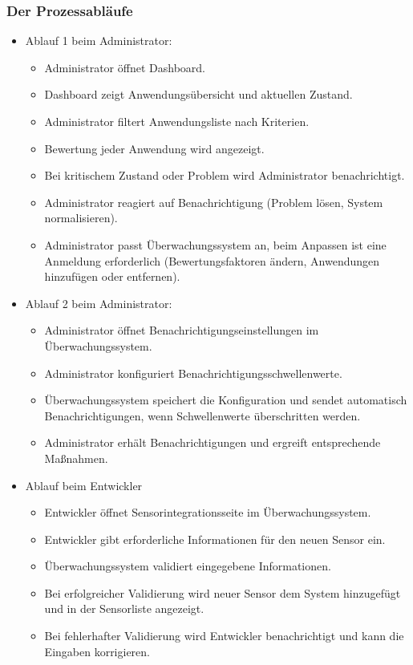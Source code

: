 \begin{flushleft}
	\subsubsection{Der Prozessabläufe}
	\begin{itemize}
	\item Ablauf 1 beim Administrator:
		\begin{itemize}
		\item Administrator öffnet Dashboard.
		\item Dashboard zeigt Anwendungsübersicht und aktuellen Zustand.
		\item Administrator filtert Anwendungsliste nach Kriterien.
		\item Bewertung jeder Anwendung wird angezeigt.
		\item Bei kritischem Zustand oder Problem wird Administrator benachrichtigt.
		\item Administrator reagiert auf Benachrichtigung (Problem lösen, System normalisieren).
		\item Administrator passt Überwachungssystem an, beim Anpassen ist eine Anmeldung erforderlich (Bewertungsfaktoren ändern, Anwendungen hinzufügen oder entfernen).
		\end{itemize}
		\item Ablauf 2 beim Administrator:
		\begin{itemize}
		\item Administrator öffnet Benachrichtigungseinstellungen im Überwachungssystem.
				\item Administrator konfiguriert Benachrichtigungsschwellenwerte.
				\item Überwachungssystem speichert die Konfiguration und sendet automatisch Benachrichtigungen, wenn Schwellenwerte überschritten werden.
				\item Administrator erhält Benachrichtigungen und ergreift entsprechende Maßnahmen.
		\end{itemize}
		\item Ablauf beim Entwickler
		\begin{itemize}
		\item Entwickler öffnet Sensorintegrationsseite im Überwachungssystem.
		\item Entwickler gibt erforderliche Informationen für den neuen Sensor ein.
		\item Überwachungssystem validiert eingegebene Informationen.
		\item Bei erfolgreicher Validierung wird neuer Sensor dem System hinzugefügt und in der Sensorliste angezeigt.
		\item Bei fehlerhafter Validierung wird Entwickler benachrichtigt und kann die Eingaben korrigieren.
		\end{itemize}
		\end{itemize}

\end{flushleft}
